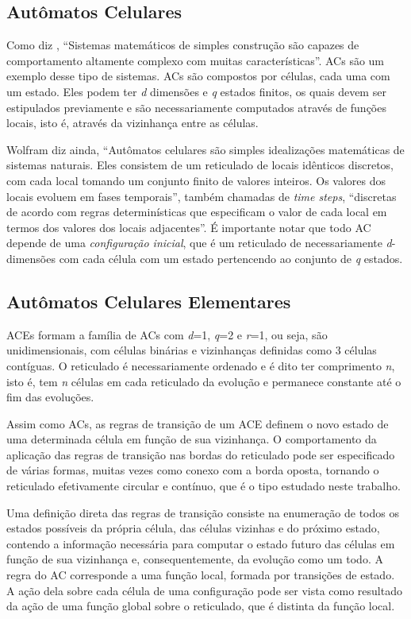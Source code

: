 \documentclass[a4paper,12pt]{ltxdoc}
\newcommand\tab[1][1cm]{\hspace*{#1}}
\begin{document}
\subsection{Autômatos Celulares} \label{ref_ac}
Como diz \cite{wolfram1983cellular}, ``Sistemas matemáticos de simples construção são capazes de comportamento altamente complexo com muitas características''. ACs são um exemplo desse tipo de sistemas. ACs são compostos por células, cada uma com um estado. Eles podem ter \textit{d} dimensões e \textit{q} estados finitos, os quais devem ser estipulados previamente e são necessariamente computados através de funções locais, isto é, através da vizinhança entre as células.

\tab Wolfram diz ainda, ``Autômatos celulares são simples idealizações matemáticas de sistemas naturais. Eles consistem de um reticulado de locais idênticos discretos, com cada local tomando um conjunto finito de valores inteiros. Os valores dos locais evoluem em fases temporais'', também chamadas de \textit{time steps}, ``discretas de acordo com regras determinísticas que especificam o valor de cada local em termos dos valores dos locais adjacentes''. É importante notar que todo AC depende de uma \textit{configuração inicial}, que é um reticulado de necessariamente \textit{d}-dimensões com cada célula com um estado pertencendo ao conjunto de \textit{q} estados.

\subsection{Autômatos Celulares Elementares} \label{ref_ace}

ACEs formam a família de ACs com \textit{d}=1, \textit{q}=2 e \textit{r}=1, ou seja, são unidimensionais, com células binárias e vizinhanças definidas como 3 células contíguas. O reticulado é necessariamente ordenado e é dito ter comprimento \textit{n}, isto é, tem \textit{n} células em cada reticulado da evolução e permanece constante até o fim das evoluções.

\tab Assim como ACs, as regras de transição de um ACE definem o novo estado de uma determinada célula em função de sua vizinhança. O comportamento da aplicação das regras de transição nas bordas do reticulado pode ser especificado de várias formas, muitas vezes como conexo com a borda oposta, tornando o reticulado efetivamente circular e contínuo, que é o tipo estudado neste trabalho.

\tab Uma definição direta das regras de transição consiste na enumeração de todos os estados possíveis da própria célula, das células vizinhas e do próximo estado, contendo a informação necessária para computar o estado futuro das células em função de sua vizinhança e, consequentemente, da evolução como um todo. A regra do AC corresponde a uma função local, formada por transições de estado. A ação dela sobre cada célula de uma configuração pode ser vista como resultado da ação de uma função global sobre o reticulado, que é distinta da função local.
\end{document}
